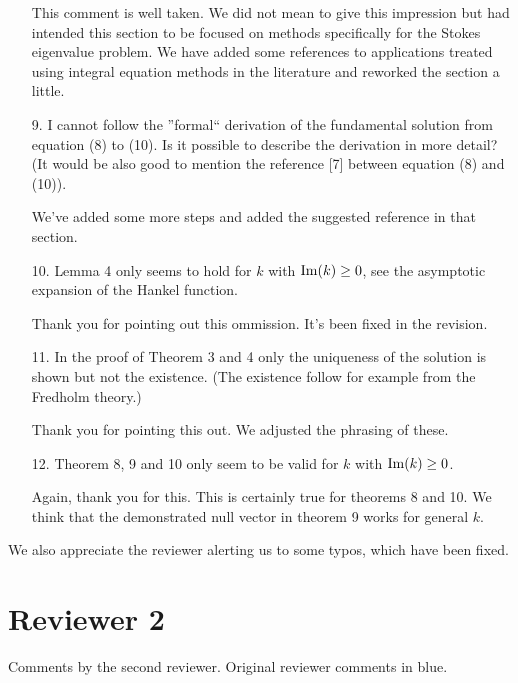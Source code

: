 \documentclass{article}
\begin{document}
\begin{itemize}
  This comment is well taken.
  We did not mean to give this impression but had intended this section
  to be focused on methods specifically for the Stokes eigenvalue problem.
  We have added some references to applications treated using integral
  equation methods in the literature and reworked the section
  a little.

\item[9.] {\color{blue}
  I cannot follow the ”formal“ derivation of the fundamental solution from
  equation (8) to (10). Is it possible to describe the derivation in more
  detail? (It would be also good to mention the reference [7] between
  equation (8) and (10)).}

  We've added some more steps and added the suggested
  reference in that section.

\item[10.] {\color{blue}
  Lemma 4 only seems to hold for $k$ with ${\rm Im}(k) \geq 0$,
  see the asymptotic expansion of the Hankel function.}

  Thank you for pointing out this ommission. It's been fixed
  in the revision.

\item[11.] {\color{blue} In the proof of Theorem 3 and 4 only the
  uniqueness of the solution is shown but not the existence.
  (The existence follow for example from the Fredholm theory.)}

  Thank you for pointing this out. We adjusted the
  phrasing of these.

\item[12.] {\color{blue}
  Theorem 8, 9 and 10 only seem to be valid for $k$ with
  ${\rm Im}(k) \geq 0$.}

  Again, thank you for this. This is certainly true for theorems
  8 and 10. We think that the demonstrated null vector in
  theorem 9 works for general $k$.

\end{itemize}

We also appreciate the reviewer alerting us to some typos, which have
been fixed.

\section{Reviewer 2}


Comments by the second reviewer. Original reviewer comments
in {\color{blue} blue}.
\end{document}
